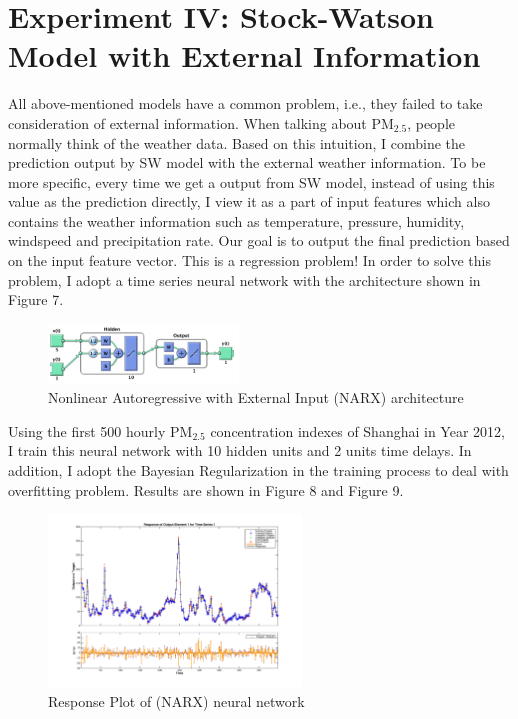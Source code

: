 \documentclass[letterpaper]{article}
\begin{document}
\section{Experiment IV: Stock-Watson Model with External Information}
All above-mentioned models have a common problem, i.e., they failed to take consideration of external information. When talking about $\text{PM}_{2.5}$, people normally think of the weather data. Based on this intuition, I combine the prediction output by SW model with the external weather information. To be more specific, every time we get a output from SW model, instead of using this value as the prediction directly, I view it as a part of input features which also contains the weather information such as temperature, pressure, humidity, windspeed and precipitation rate. Our goal is to output the final prediction based on the input feature vector. This is a regression problem! In order to solve this problem, I adopt a time series neural network with the architecture shown in Figure 7.

\begin{figure}[htbp]
	\centerline{\includegraphics[width=0.45\textwidth]{PM25_NN_arch.jpg}}
	\caption{Nonlinear Autoregressive with External Input (NARX) architecture }\label{fig:digit}
\end{figure}

Using the first 500 hourly $\text{PM}_{2.5}$ concentration indexes of Shanghai in Year 2012, I train this neural network with 10 hidden units and 2 units time delays. In addition, I adopt the Bayesian Regularization in the training process to deal with overfitting problem. Results are shown in Figure 8 and Figure 9. 

\begin{figure}[htbp]
	\centerline{\includegraphics[width=0.60\textwidth]{PM25_h10d2_tsResponse.pdf}}
	\caption{Response Plot of (NARX) neural network }\label{fig:digit}
\end{figure}
\end{document}
